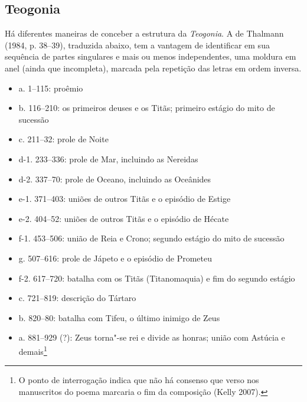 \subsection{Teogonia}

Há diferentes maneiras de conceber a estrutura da \emph{Teogonia}. A de
Thalmann (1984, p. 38--39), traduzida abaixo, tem a vantagem de
identificar em sua sequência de partes singulares e mais ou menos
independentes, uma moldura em anel (ainda que incompleta), marcada pela
repetição das letras em ordem inversa.

\begin{itemize}
\item
a. 1--115: proêmio

\item 
b. 116--210: os primeiros deuses e os Titãs; primeiro estágio do mito de sucessão

\item 
c. 211--32: prole de Noite

\item 
d-1. 233--336: prole de Mar, incluindo as Nereidas

\item 
d-2. 337--70: prole de Oceano, incluindo as Oceânides

\item 
e-1. 371--403: uniões de outros Titãs e o episódio de Estige

\item 
e-2. 404--52: uniões de outros Titãs e o episódio de Hécate

\item 
f-1. 453--506: união de Reia e Crono; segundo estágio do mito de sucessão

\item 
g. 507--616: prole de Jápeto e o episódio de Prometeu

\item 
f-2. 617--720: batalha com os Titãs (Titanomaquia) e fim do segundo estágio

\item 
c. 721--819: descrição do Tártaro

\item 
b. 820--80: batalha com Tifeu, o último inimigo de Zeus

\item 
a. 881--929 (?): Zeus torna"-se rei e divide as honras; união com Astúcia
e demais\footnote{O ponto de interrogação indica que não há consenso que
  verso nos manuscritos do poema marcaria o fim da composição (Kelly
  2007).}
\end{itemize}

